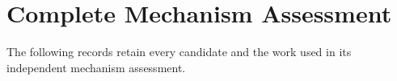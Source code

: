 \section{Complete Mechanism Assessment}\label{app:r15mechanismrecord}
The following records retain every candidate and the work used in its independent mechanism assessment.


